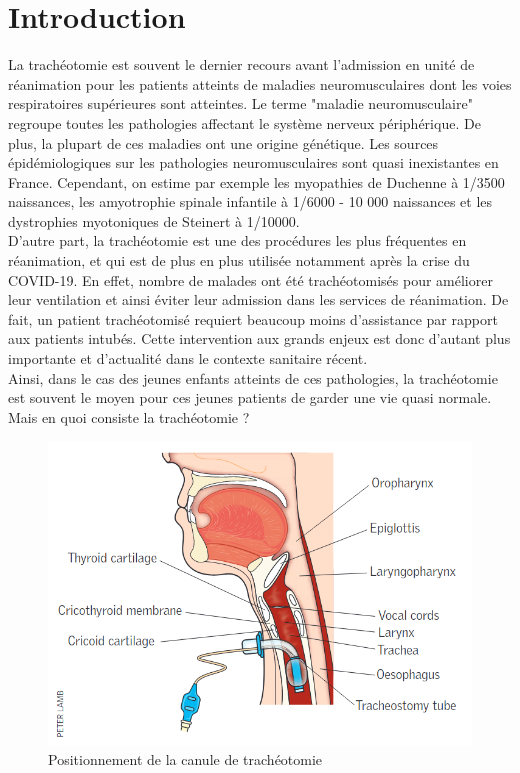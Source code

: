 \documentclass [11pt]{article}
\begin{document}
\newpage
\part{Introduction}
\par 
 La trachéotomie est souvent le dernier recours avant l'admission en unité de réanimation pour les patients atteints de maladies neuromusculaires dont les voies respiratoires supérieures sont atteintes. Le terme "maladie neuromusculaire" regroupe toutes les pathologies affectant le système nerveux périphérique. De plus, la plupart de ces maladies ont une origine génétique. Les sources épidémiologiques sur les pathologies neuromusculaires sont quasi inexistantes en France. Cependant, on estime par exemple les myopathies de Duchenne à 1/3500 naissances, les amyotrophie spinale infantile à  1/6000 - 10 000 naissances et les dystrophies myotoniques de Steinert à  1/10000.\\

D’autre part, la trachéotomie est une des procédures les plus fréquentes en réanimation, et qui est de plus en plus utilisée notamment après la crise du COVID-19. En effet, nombre de malades ont été trachéotomisés pour améliorer leur ventilation et ainsi éviter leur admission dans les services de réanimation. De fait, un patient trachéotomisé requiert beaucoup moins d'assistance par rapport aux patients intubés. Cette intervention aux grands enjeux est donc d’autant plus importante et d’actualité dans le contexte sanitaire récent. \\

Ainsi, dans le cas des jeunes enfants atteints de ces pathologies, la trachéotomie est souvent le moyen pour ces jeunes patients de garder une vie quasi normale. Mais en quoi consiste la trachéotomie ? \\

\begin{figure}[!h]
\centering
\includegraphics[scale=0.4]{tracheo_principe.png} 
\caption{Positionnement de la canule de trachéotomie}
\label{tracheo}
\end{figure}
\end{document}
